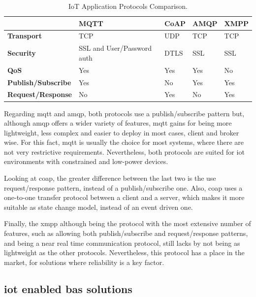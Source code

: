\begin{table}[]
	\centering
	\begin{tabular}{|l|l|l|l|l|}
		\hline
		& \textbf{MQTT}              & \textbf{CoAP} & \textbf{AMQP} & \textbf{XMPP} \\ \hline
		\textbf{Transport}         & TCP                        & UDP           & TCP           & TCP           \\ \hline
		\textbf{Security}          & SSL and User/Password auth & DTLS          & SSL           & SSL           \\ \hline
		\textbf{QoS}               & Yes                        & Yes           & Yes           & No            \\ \hline
		\textbf{Publish/Subscribe} & Yes                        & No            & Yes           & Yes           \\ \hline
		\textbf{Request/Response}  & No                         & Yes           & No            & Yes           \\ \hline
	\end{tabular}
	\caption{IoT Application Protocols Comparison.}
	\label{iotapplayer}
\end{table}

Regarding \ac{mqtt} and \ac{amqp}, both protocols use a publish/subscribe pattern but, although \ac{amqp} offers a wider variety of features, \ac{mqtt} gains for being more lightweight, less complex and easier to deploy in most cases, client and broker wise. For this fact, \ac{mqtt} is usually the choice for most systems, where there are not very restrictive requirements. Nevertheless, both protocols are suited for \ac{iot} environments with constrained and low-power devices.

Looking at \ac{coap}, the greater difference between the last two is the use request/response pattern, instead of a publish/subscribe one. Also, \ac{coap} uses a one-to-one transfer protocol between a client and a server, which makes it more suitable as state change model, instead of an event driven one.

Finally, the \ac{xmpp} although being the protocol with the most extensive number of features, such as allowing both publish/subscribe and request/response patterns, and being a near real time communication protocol, still lacks by not being as lightweight as the other protocols. Nevertheless, this protocol has a place in the market, for solutions where reliability is a key factor.


\subsection{\ac{iot} enabled \ac{bas} solutions}

